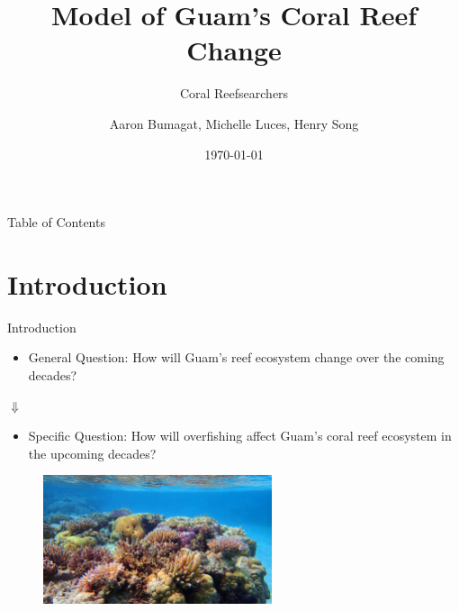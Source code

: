\documentclass{beamer}
\title[]{Model of Guam's Coral Reef Change}
\subtitle{Coral Reefsearchers}
\author{Aaron Bumagat, Michelle Luces, Henry Song }
\institute{University of Guam}
\date{\today}
\begin{document}
\frame{\titlepage}

\AtBeginSection[]{
    \begin{frame}{}
        \frametitle{}
        \setcounter{tocdepth}{2}
        \tableofcontents[currentsection, sections = \thesection]
        \setcounter{tocdepth}{1}
    \end{frame}
}

\begin{frame}{Table of Contents}
    \tableofcontents
\end{frame}

\section{Introduction}
\begin{frame}{Introduction}
\begin{itemize}
    \item General Question: How will Guam's reef ecosystem change over the coming decades?
\end{itemize}
\begin{center}
    $\Downarrow$
\end{center}
\begin{itemize}
    \item Specific Question: How will overfishing affect Guam's coral reef ecosystem in the upcoming decades?
\end{itemize}
\begin{figure}
    \centering
    \includegraphics[width=0.6\textwidth]{Figures/coral_picture.jpg}
\end{figure}
\end{frame}
\end{document}
